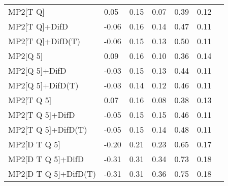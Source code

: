 \begin{table}
\begin{tabular}{l l l l l l l }
    MP2[T Q] & 0.05 & 0.15 & 0.07 & 0.39 & 0.12 \\ 
    MP2[T Q]+DifD & -0.06 & 0.16 & 0.14 & 0.47 & 0.11 \\ 
    MP2[T Q]+DifD(T) & -0.06 & 0.15 & 0.13 & 0.50 & 0.11 \\ 
    MP2[Q 5] & 0.09 & 0.16 & 0.10 & 0.36 & 0.14 \\ 
    MP2[Q 5]+DifD & -0.03 & 0.15 & 0.13 & 0.44 & 0.11 \\ 
    MP2[Q 5]+DifD(T) & -0.03 & 0.14 & 0.12 & 0.46 & 0.11 \\ 
    MP2[T Q 5] & 0.07 & 0.16 & 0.08 & 0.38 & 0.13 \\ 
    MP2[T Q 5]+DifD & -0.05 & 0.15 & 0.15 & 0.46 & 0.11 \\ 
    MP2[T Q 5]+DifD(T) & -0.05 & 0.15 & 0.14 & 0.48 & 0.11 \\ 
    MP2[D T Q 5] & -0.20 & 0.21 & 0.23 & 0.65 & 0.17 \\ 
    MP2[D T Q 5]+DifD & -0.31 & 0.31 & 0.34 & 0.73 & 0.18 \\ 
    MP2[D T Q 5]+DifD(T) & -0.31 & 0.31 & 0.36 & 0.75 & 0.18 \\ 
    \hline
  \end{tabular}
\end{table}
